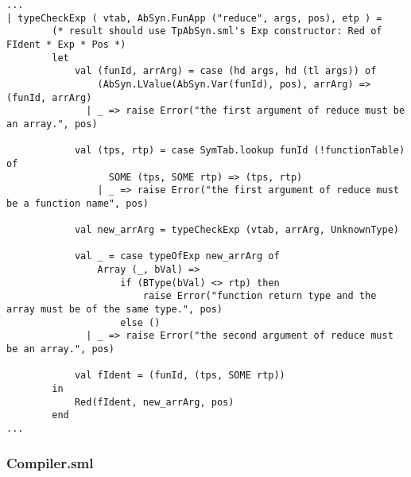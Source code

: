 \documentclass[12pt]{article}
\begin{document}
\begin{lstlisting}
...
| typeCheckExp ( vtab, AbSyn.FunApp ("reduce", args, pos), etp ) =
        (* result should use TpAbSyn.sml's Exp constructor: Red of FIdent * Exp * Pos *)
        let 
            val (funId, arrArg) = case (hd args, hd (tl args)) of 
                (AbSyn.LValue(AbSyn.Var(funId), pos), arrArg) => (funId, arrArg)
              | _ => raise Error("the first argument of reduce must be an array.", pos)
           
            val (tps, rtp) = case SymTab.lookup funId (!functionTable) of 
                  SOME (tps, SOME rtp) => (tps, rtp)
                | _ => raise Error("the first argument of reduce must be a function name", pos)

            val new_arrArg = typeCheckExp (vtab, arrArg, UnknownType)

            val _ = case typeOfExp new_arrArg of 
                Array (_, bVal) => 
                    if (BType(bVal) <> rtp) then
                        raise Error("function return type and the array must be of the same type.", pos)
                    else ()
              | _ => raise Error("the second argument of reduce must be an array.", pos)

            val fIdent = (funId, (tps, SOME rtp))
        in
            Red(fIdent, new_arrArg, pos)
        end
...
\end{lstlisting}

\pagebreak

\subsubsection{Compiler.sml}
\end{document}

